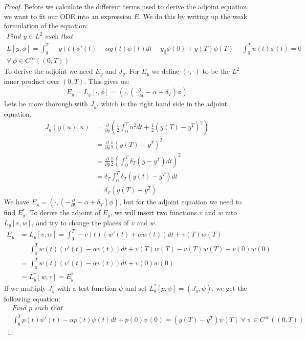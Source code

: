 \documentclass[11pt,a4paper]{article}
\begin{document}
\begin{proof}
Before we calculate the different terms used to derive the adjoint equation, we want to fit our ODE into an expression $E$. We do this by writing up the weak formulation of the equation:
\begin{gather*}
\textit{Find $y \in L^2$ such that}\\
L[y,\phi] = \int_0^T-y(t)\phi'(t)-\alpha y(t)\phi(t)dt -y_0\phi(0)+y(T)\phi(T)-\int_0^Tu(t)\phi(t)=0\\ \forall \ \phi \in C^{\infty}((0,T))
\end{gather*}
To derive the adjoint we need $E_y$ and $J_y$. For $E_y$ we define $(\cdot,\cdot)$ to be the $L^2$ inner product over $(0,T)$. This gives us:
\begin{align*}
E_y=L_y[\cdot,\phi]=(\cdot,(\frac{\partial}{-\partial t} - \alpha + \delta_T)\phi)  
\end{align*}
Lets be more thorough with $J_y$, which is the right hand side in the adjoint equation.
\begin{align*}
J_y(y(u),u) &= \frac{\partial}{\partial y}(\frac{1}{2}\int_0^Tu^2dt + \frac{1}{2}(y(T)-y^T)^2) \\ &= \frac{\partial}{\partial y} \frac{1}{2}(y(T)-y^T)^2 \\
&= \frac{\partial}{\partial y}\frac{1}{2}(\int_0^T \delta_T(y-y^T)dt)^2 \\
&= \delta_T\int_0^T \delta_T(y(t)-y^T)dt \\
&= \delta_T(y(T)-y^T)
\end{align*}
We have $E_y=(\cdot,(-\frac{\partial}{\partial t} - \alpha + \delta_T)\phi)$, but for the adjoint equation we need to find $E_y^*$.
To derive the adjoint of $E_y$, we will insert two functions $v$ and $w$ into $L_y[v,w]$, and try to change the places of $v$ and $w$.
\begin{align*}
E_y&=L_y[v,w]=\int_0^T-v(t)(w'(t)+\alpha w(t))dt + v(T)w(T) \\
&=\int_0^Tw(t)(v'(t)-\alpha v(t))dt + v(T)w(T)-v(T)w(T) +v(0)w(0) \\
&=\int_0^Tw(t)(v'(t)-\alpha v(t))dt+v(0)w(0) \\
&=L_y^*[w,v]=E_y^*
\end{align*}
If we multiply $J_y$ with a test function $\psi$ and set $L_y^*[p,\psi]=(J_y,\psi)$, we get the following equation:
\begin{align*}
&\textit{Find $p$ such that}\\
&\int_0^Tp(t)\psi'(t)-\alpha p(t)\psi(t)dt + p(0)\psi(0)= (y(T)-y^T)\psi(T)\ \forall \ \psi \in C^{\infty}((0,T))

\end{align*}
\end{proof}
\end{document}

